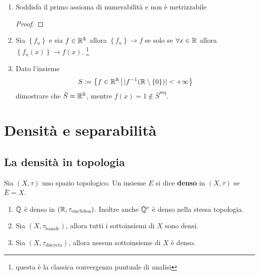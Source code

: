 \begin{remark}
\begin{enumerate}
\begin{proof}
		\end{proof}
		\item Soddisfa il primo assioma di numerabilità e non è metrizzabile
		\begin{proof}
		\end{proof}
		\item Sia $\left\{f_n\right\}$ e sia $f \in \mathbb{R}^{\mathbb{R}}$ allora $\left\{f_n\right\} \rightarrow f$ se solo se $\forall x \in \mathbb{R}$ allora $\left\{f_n(x)\right\} \rightarrow f(x)$. \footnote{questa è la classica convergenza puntuale di analisi}
		\item Dato l'insieme 
		\begin{equation*}
			S \coloneqq \left\{ f \in \mathbb{R}^{\mathbb{R}} \,\middle|\, |f^{-1}(\mathbb{R} \setminus \left\{0\right\})| < +\infty \right\}
		\end{equation*}
		dimostrare che $\bar{S} = \mathbb{R}^{\mathbb{R}}$, mentre $f(x)= 1 \notin \bar{S}^\text{seq}$. 
	\end{enumerate}
	\end{remark}



\section{Densità e separabilità}
\subsection{\textcolor{TopGener}{\textbf{La densità in topologia}}}



\begin{definition}
	Sia $(X,\tau)$ uno spazio topologico. Un insieme $E$ si dice \textbf{denso} in $(X, \tau)$ se $\bar{E} = X$. 
\end{definition}

\begin{example}
\begin{enumerate}
	\item $\mathbb{Q}$ è denso in $(\mathbb{R}, \tau_{\text{euclidea}})$. Inoltre anche $\mathbb{Q}^c$ è denso nella stessa topologia.
	\item Sia $(X,\tau_{\text{banale}})$, allora tutti i sottoinsiemi di $X$ sono densi.
	\item Sia $(X,\tau_{\text{discreta}})$, allora nessun sottoinsieme di $X$ è denso.
\end{enumerate}
\end{example}

